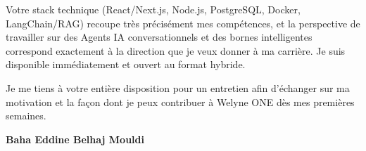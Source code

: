 \documentclass[a4paper,11pt]{article}
\begin{document}
Votre stack technique (React/Next.js, Node.js, PostgreSQL, Docker, LangChain/RAG) recoupe très précisément mes compétences, et la perspective de travailler sur des Agents IA conversationnels et des bornes intelligentes correspond exactement à la direction que je veux donner à ma carrière. Je suis disponible immédiatement et ouvert au format hybride.

Je me tiens à votre entière disposition pour un entretien afin d'échanger sur ma motivation et la façon dont je peux contribuer à Welyne ONE dès mes premières semaines.

\vspace{0.8cm}

\begin{flushright}
{\bfseries Baha Eddine Belhaj Mouldi}
\end{flushright}
\end{document}
